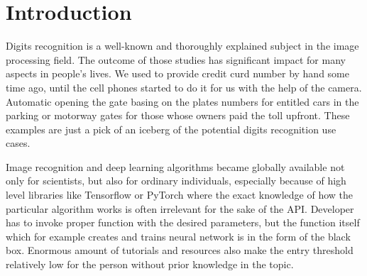 \chapter{Introduction}
Digits recognition is a well-known and thoroughly explained subject in the image processing field. The outcome of those studies has significant impact for many aspects in people's lives. We used to provide credit curd number by hand some time ago, until the cell phones started to do it for us with the help of the camera. Automatic opening the gate basing on the plates numbers for entitled cars in the parking or motorway gates for those whose owners paid the toll upfront. These examples are just a pick of an iceberg of the potential digits recognition use cases. 

Image recognition and deep learning algorithms became globally available not only for scientists, but also for ordinary individuals, especially because of high level libraries like Tensorflow or PyTorch where the exact knowledge of how the particular algorithm works is often irrelevant for the sake of the API. Developer has to invoke proper function with the desired parameters, but the function itself which for example creates and trains neural network is in the form of the black box. Enormous amount of tutorials and resources also make the entry threshold relatively low for the person without prior knowledge in the topic.
